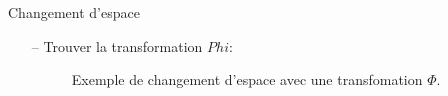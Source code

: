 \documentclass[9pt]{beamer}
\begin{document}
	\begin{frame}{Changement d'espace}
		\begin{itemize}
			\item[--] Trouver la transformation $Phi$:
			\begin{figure}[H]
				{
					\caption{\label{fig::kernel_poly}  Exemple de changement d'espace avec une transfomation $\Phi$.}
				}
			\end{figure}
		\end{itemize}
	\end{frame}
\end{document}
